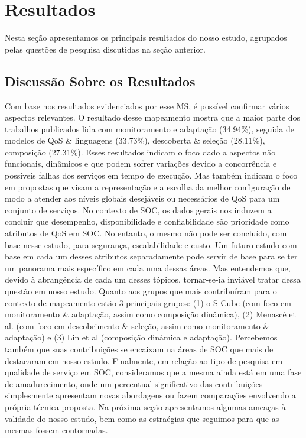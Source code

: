 \section{Resultados}\label{sec:resultados}

Nesta se\c c\~{a}o apresentamos os principais resultados do nosso
estudo, agrupados pelas quest\~{o}es de pesquisa discutidas na se\c
c\~{a}o anterior. 






\subsection{Discuss\~{a}o Sobre os Resultados}

Com base nos resultados evidenciados por esse MS, \'{e} poss\'{i}vel
confirmar v\'{a}rios aspectos relevantes. O resultado desse mapeamento
mostra que a maior parte dos trabalhos publicados lida com
monitoramento e adapta\c{c}\~{a}o (34.94\%), seguida de modelos de QoS
\& linguagens (33.73\%), descoberta \& sele\c{c}\~{a}o (28.11\%),
composi\c{c}\~{a}o (27.31\%). Esses resultados indicam o foco dado a
aspectos n\~{a}o funcionais, din\^{a}micos e que podem sofrer
varia\c{c}\~{o}es devido a concorrência e possíveis falhas dos
servi\c{c}os em tempo de execu\c{c}\~{a}o. Mas tamb\'{e}m indicam o
foco em propostas que visam a representa\c{c}\~{a}o e a escolha da
melhor configura\c{c}\~{a}o de modo a atender aos níveis globais
desej\'{a}veis ou necess\'{a}rios de QoS para um conjunto de
servi\c{c}os. 
No contexto de SOC, os dados gerais nos induzem a
concluir que desempenho, disponibilidade e confiabilidade s\~{a}o
prioridade como atributos de QoS em SOC. No entanto, o mesmo n\~{a}o
pode ser concluído, com base nesse estudo, para seguran\c{c}a,
escalabilidade e custo. Um futuro estudo com base em cada um desses
atributos separadamente pode servir de base para se ter um panorama
mais espec\'{i}fico em cada uma dessas \'{a}reas. Mas entendemos que,
devido \`{a} abrang\^{e}ncia de cada um desses t\'{o}picos,
tornar-se-ia invi\'{a}vel tratar dessa quest\~{a}o em nosso
estudo. 
Quanto aos grupos que mais contribu\'{i}ram para o contexto de
mapeamento est\~{a}o 3 principais grupos: (1) o S-Cube (com foco em
monitoramento \& adapta\c{c}\~{a}o, assim como composi\c{c}\~{a}o
din\^{a}mica), (2) Menasc\'{e} et al. (com foco em descobrimento \&
sele\c{c}\~{a}o, assim como monitoramento \& adapta\c{c}\~{a}o) e (3)
Lin et al (composi\c{c}\~{a}o din\^{a}mica e
adapta\c{c}\~{a}o). Percebemos tamb\'{e}m que suas
contribui\c{c}\~{o}es se encaixam na \'{a}reas de SOC que mais de
destacaram em nosso estudo. 
Finalmente, em rela\c c\~{a}o ao tipo de pesquisa em
qualidade de servi\c{c}o em SOC, consideramos que a mesma ainda
est\'{a} em uma fase de amadurecimento, 
onde um percentual significativo das contribui\c{c}\~{o}es
simplesmente apresentam 
novas abordagens ou fazem compara\c{c}\~{o}es envolvendo a 
própria t\'{e}cnica proposta. Na pr\'{o}xima se\c c\~{a}o apresentamos
algumas amea\c cas \`{a} validade do nosso estudo, bem como as
estra\'{e}gias que seguimos para que as mesmas
fossem contornadas.

